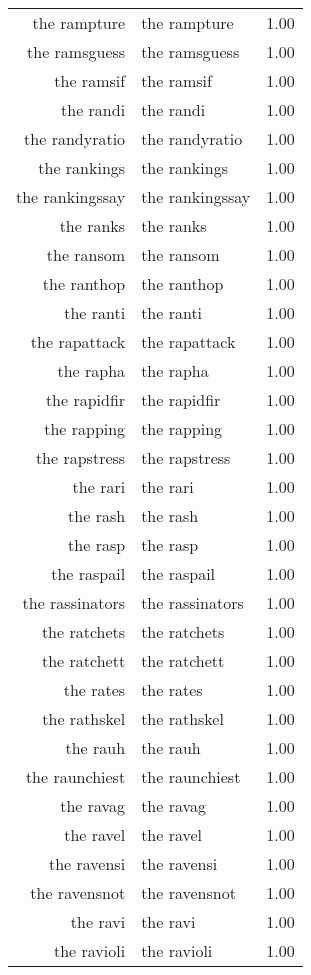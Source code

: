 \begin{table}[ht]
\begin{tabular}{rlr}
  the rampture & the rampture & 1.00 \\ 
  the ramsguess & the ramsguess & 1.00 \\ 
  the ramsif & the ramsif & 1.00 \\ 
  the randi & the randi & 1.00 \\ 
  the randyratio & the randyratio & 1.00 \\ 
  the rankings & the rankings & 1.00 \\ 
  the rankingssay & the rankingssay & 1.00 \\ 
  the ranks & the ranks & 1.00 \\ 
  the ransom & the ransom & 1.00 \\ 
  the ranthop & the ranthop & 1.00 \\ 
  the ranti & the ranti & 1.00 \\ 
  the rapattack & the rapattack & 1.00 \\ 
  the rapha & the rapha & 1.00 \\ 
  the rapidfir & the rapidfir & 1.00 \\ 
  the rapping & the rapping & 1.00 \\ 
  the rapstress & the rapstress & 1.00 \\ 
  the rari & the rari & 1.00 \\ 
  the rash & the rash & 1.00 \\ 
  the rasp & the rasp & 1.00 \\ 
  the raspail & the raspail & 1.00 \\ 
  the rassinators & the rassinators & 1.00 \\ 
  the ratchets & the ratchets & 1.00 \\ 
  the ratchett & the ratchett & 1.00 \\ 
  the rates & the rates & 1.00 \\ 
  the rathskel & the rathskel & 1.00 \\ 
  the rauh & the rauh & 1.00 \\ 
  the raunchiest & the raunchiest & 1.00 \\ 
  the ravag & the ravag & 1.00 \\ 
  the ravel & the ravel & 1.00 \\ 
  the ravensi & the ravensi & 1.00 \\ 
  the ravensnot & the ravensnot & 1.00 \\ 
  the ravi & the ravi & 1.00 \\ 
  the ravioli & the ravioli & 1.00 \\ 

\end{tabular}
\end{table}
